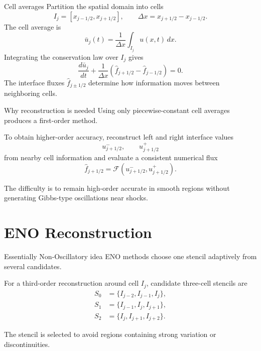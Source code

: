 \documentclass[aspectratio=169]{beamer}
\newcommand{\uh}{\bar{u}}
\newcommand{\dx}{\Delta x}
\begin{document}
\begin{frame}{Cell averages}
Partition the spatial domain into cells
\[
I_j=[x_{j-1/2},x_{j+1/2}], \qquad \dx=x_{j+1/2}-x_{j-1/2}.
\]
The cell average is
\begin{equation}
    \uh_j(t)=\frac{1}{\dx}\int_{I_j}u(x,t)\,dx.
\end{equation}
Integrating the conservation law over $I_j$ gives
\begin{equation}
    \frac{d\uh_j}{dt}
    +\frac{1}{\dx}
    \left(
    \hat f_{j+1/2}-\hat f_{j-1/2}
    \right)=0.
\end{equation}
The interface fluxes $\hat f_{j\pm1/2}$ determine how information moves between neighboring cells.
\end{frame}

\begin{frame}{Why reconstruction is needed}
Using only piecewise-constant cell averages produces a first-order method.

\medskip
To obtain higher-order accuracy, reconstruct left and right interface values
\[
    u^-_{j+1/2}, \qquad u^+_{j+1/2}
\]
from nearby cell information and evaluate a consistent numerical flux
\begin{equation}
    \hat f_{j+1/2}=\mathcal{F}
    \left(u^-_{j+1/2},u^+_{j+1/2}\right).
\end{equation}

The difficulty is to remain high-order accurate in smooth regions without generating Gibbs-type oscillations near shocks.
\end{frame}

\section{ENO Reconstruction}

\begin{frame}{Essentially Non-Oscillatory idea}
ENO methods choose one stencil adaptively from several candidates.

\medskip
For a third-order reconstruction around cell $I_j$, candidate three-cell stencils are
\begin{align*}
S_0 &= \{I_{j-2},I_{j-1},I_j\},\\
S_1 &= \{I_{j-1},I_j,I_{j+1}\},\\
S_2 &= \{I_j,I_{j+1},I_{j+2}\}.
\end{align*}

The stencil is selected to avoid regions containing strong variation or discontinuities.
\end{frame}
\end{document}
